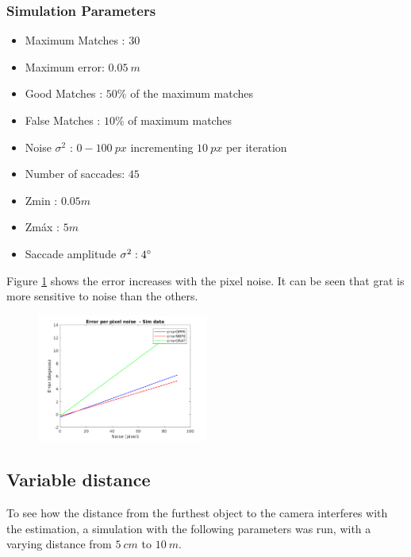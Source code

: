 \subsubsection{Simulation Parameters}
\begin{itemize}
	\item Maximum Matches : $30$
	\item Maximum error: $0.05 \ m$
	\item Good Matches : $50 \%$ of the maximum matches
	\item False Matches : $10 \%$ of maximum matches
	\item Noise $\sigma^2$ : $0-100 \ px$ incrementing $10 \ px$ per iteration
	\item Number of saccades: $45$
	\item Zmin : $0.05 m$
	\item Zmáx : $5 m$
	\item Saccade amplitude $\sigma^2 : 4 \degree $
\end{itemize}
Figure \ref{cha5:sec1:noise} shows the error increases with the pixel noise. It can be seen that \acrshort{grat} is more sensitive to noise than the others.
\begin{figure}[ht]
	\centering
	\includegraphics[width=0.5\textwidth]{images/sim/noise.png}
	\label{cha5:sec1:noise}
\end{figure}

\subsection{Variable distance}
To see how the distance from the furthest object to the camera interferes with the estimation, a simulation with the following parameters was run, with a varying distance from $5 \ cm$ to $10 \ m$.
